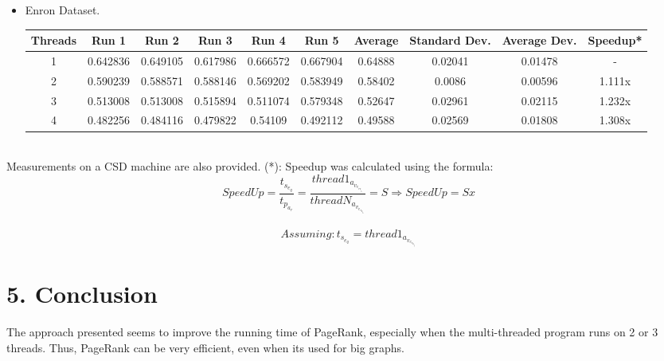 \documentclass{article}
\begin{document}
\begin{itemize}
    \item Enron Dataset.
    \begin{center}
    \begin{tabular}{||c | c c c c c | c c c | c||} 
    \hline
    Threads & Run 1 & Run 2 & Run 3 & Run 4 & Run 5 & Average & Standard Dev. & Average Dev. & Speedup* \\ [0.5ex] 
    \hline\hline
    1 & 0.642836 & 0.649105 & 0.617986 & 0.666572 & 0.667904 & 0.64888 & 0.02041 & 0.01478 & - \\ 
    \hline
    2 & 0.590239 & 0.588571 & 0.588146 & 0.569202 & 0.583949 & 0.58402 & 0.0086 & 0.00596 & 1.111x \\ 
    \hline
    3 & 0.513008 & 0.513008 & 0.515894 & 0.511074 & 0.579348 & 0.52647 & 0.02961 & 0.02115 & 1.232x \\ 
    \hline
    4 & 0.482256 & 0.484116 & 0.479822 & 0.54109 & 0.492112 & 0.49588 & 0.02569 & 0.01808 & 1.308x \\ 
    \hline
    \end{tabular}
    \end{center}
  
\end{itemize}

\\Measurements on a CSD machine are also provided. (*): Speedup was calculated using the formula:
\[SpeedUp = \frac{t_s_e_q}{t_p_a_r} = \frac{thread1_a_v_e_r_a_g_e}{threadN_a_v_e_r_a_g_e} = S \Rightarrow SpeedUp = S x \]\\
\[Assuming: t_s_e_q = thread1_a_v_e_r_a_g_e\]



\section*{5. Conclusion}
The approach presented seems to improve the running time of PageRank, especially when the multi-threaded program runs on 2 or 3 threads. Thus, PageRank can be very efficient, even when its used for big graphs.
\end{document}
